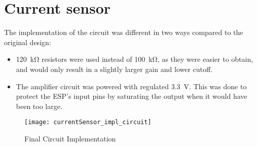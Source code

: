 \graphicspath{{content/4_implementation/figures/}}
\section{Current sensor}\label{sec:current_sensor_physical}

The implementation of the circuit was different in two ways compared to the original design:
\begin{itemize}
   \item \SI{120}{\kilo\ohm} resistors were used instead of \SI{100}{\kilo\ohm}, as they were easier to obtain, and would only result in a
         slightly larger gain and lower cutoff.
   \item The amplifier circuit was powered with regulated \SI{3.3}{V}. This was done to protect the ESP's input pins by saturating the output
         when it would have been too large.
\end{itemize}

\begin{figure}[!htb]
  \centering
  \texttt{[image: currentSensor\_impl\_circuit]}
  \caption{Final Circuit Implementation}
\end{figure}